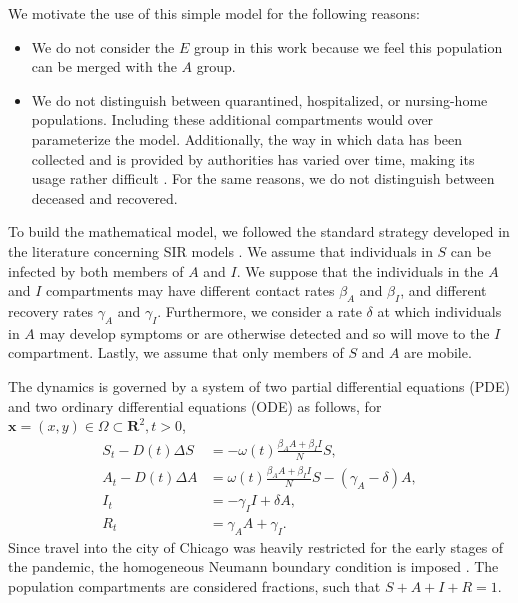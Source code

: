 \documentclass[11pt]{article}
\newcommand{\R}{\mathbf{R}}
\renewcommand\vec{\mathbf}
\begin{document}
		We motivate the use of this simple model for the following reasons:
		\begin{itemize}
			\item
				We do not consider the $E$ group in this work because we feel this population can be merged with the $A$ group.
			\item
				We do not distinguish between quarantined, hospitalized, or nursing-home populations.
				Including these additional compartments would over parameterize the model.
				Additionally, the way in which data has been collected and is provided by authorities has varied over time, making its usage rather difficult \cite{sara-data}.
				For the same reasons, we do not distinguish between deceased and recovered.
		\end{itemize}
	
		To build the mathematical model, we followed the standard strategy developed in the literature concerning SIR models \cite{bio-models}.
		We assume that individuals in $S$ can be infected by both members of $A$ and $I$.
		We suppose that the individuals in the $A$ and $I$ compartments may have different contact rates $\beta_A$ and $\beta_I$, and different recovery rates $\gamma_A$ and $\gamma_I$.
		Furthermore, we consider a rate $\delta$ at which individuals in $A$ may develop symptoms or are otherwise detected and so will move to the $I$ compartment.
		Lastly, we assume that only members of $S$ and $A$ are mobile.
		
		The dynamics is governed by a system of two partial differential equations (PDE) and two ordinary differential equations (ODE) as follows, for $\vec{x} = (x,y) \in \Omega \subset \R^2, t > 0$,
		\begin{equation} \label{eq:model}
			\begin{aligned}
				S_t - D(t) \Delta S &= - \omega(t) \frac{\beta_A A + \beta_I I}{N} S, \\
				A_t - D(t) \Delta A &= \omega(t) \frac{\beta_A A + \beta_I I}{N} S - (\gamma_A - \delta) A, \\
				I_t &= - \gamma_I I + \delta A, \\
				R_t &= \gamma_A A + \gamma_I.
			\end{aligned}
		\end{equation}
		Since travel into the city of Chicago was heavily restricted for the early stages of the pandemic, the homogeneous Neumann boundary condition is imposed \cite{Mammeri+2020+102+113}.
		The population compartments are considered fractions, such that $S + A + I + R = 1$.
	
\end{document}
